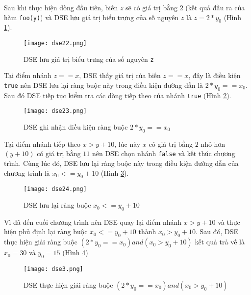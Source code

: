 Sau khi thực hiện dòng đầu tiên, biến $ z $ sẽ có giá trị bằng $ 2 $ 
(kết quả đầu ra của hàm \texttt{foo(y)}) và DSE lưu giá trị biểu trưng của số 
nguyên $ z $ là $z = 2*y_{0}$ (Hình \ref{fig:dse22}).

\begin{figure}[H]	
	\begin{center}
		\texttt{[image: dse22.png]}
	\end{center}
	\caption{DSE lưu giá trị biểu trưng của số nguyên \texttt{z}}
	\label{fig:dse22}		
\end{figure}

Tại điểm nhánh $ z == x $, DSE thấy giá trị của biến $ z == x $, đây là điều 
kiện \texttt{true} nên DSE lưu lại ràng buộc này trong điều kiện đường dẫn là 
$2*y_{0} == x_{0}$. Sau đó DSE tiếp tục kiểm tra các dòng tiếp theo của nhánh
 \texttt{true} (Hình \ref{fig:dse23}).

\begin{figure}[H]	
	\begin{center}
		\texttt{[image: dse23.png]}
	\end{center}
	\caption{DSE ghi nhận điều kiện ràng buộc $2*y_{0} == x_{0}$}
	\label{fig:dse23}	
\end{figure}

Tại điểm nhánh tiếp theo $ x > y+10 $, lúc này $ x $ có giá trị bằng $ 2 $ 
nhỏ hơn $ (y + 10) $ có giá trị bằng $ 11 $ nên DSE chọn nhánh \texttt{false} 
và kết thúc chương trình. Cùng lúc đó, DSE lưu lại ràng buộc này trong điều 
kiện đường dẫn của chương trình là $x_{0} <= y_{0} + 10$ (Hình \ref{fig:dse24}).

\begin{figure}[H]	
	\begin{center}
		\texttt{[image: dse24.png]}
	\end{center}
	\caption{DSE lưu lại ràng buộc $x_{0} <= y_{0} + 10$}
	\label{fig:dse24}		
\end{figure}

Vì đã đến cuối chương trình nên DSE quay lại điểm nhánh $ x > y+10 $ và thực 
hiện phủ định lại ràng buộc $x_{0} <= y_{0} + 10$ thành $ x_{0} > y_{0} + 10 $. 
Sau đó, DSE thực hiện giải ràng buộc $(2*y_{0} == x_{0}) and (x_{0} > y_{0} + 10)$ 
kết quả trả về là $x_{0} = 30$ và $y_{0} = 15$ (Hình \ref{fig:dse3})

\begin{figure}[H]	
	\begin{center}
		\texttt{[image: dse3.png]}
	\end{center}
	\caption{DSE thực hiện giải ràng buộc $(2*y_{0} == x_{0}) and (x_{0} > y_{0} + 10)$}
	\label{fig:dse3}
\end{figure}

